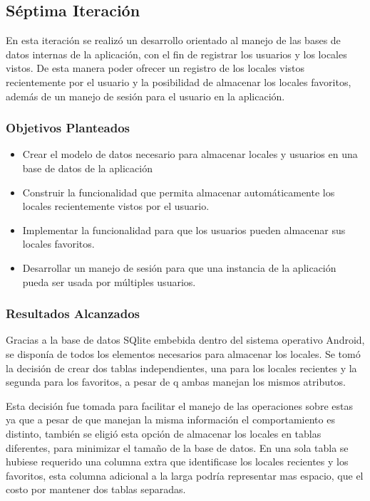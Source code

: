 \subsection{Séptima Iteración}

En esta iteración se realizó un desarrollo orientado al manejo de las bases de datos internas de la aplicación, con el fin de registrar los usuarios y los locales vistos. De esta manera poder ofrecer un registro de los locales vistos recientemente por el usuario y la posibilidad de almacenar los locales favoritos, además de un manejo de sesión para el usuario en la aplicación.

\subsubsection{Objetivos Planteados} 

\begin{itemize}
\item Crear el modelo de datos necesario para almacenar locales y usuarios en una base de datos de la aplicación
\item Construir la funcionalidad que permita almacenar automáticamente los locales recientemente vistos por el usuario.
\item Implementar la funcionalidad para que los usuarios pueden almacenar sus locales favoritos.
\item Desarrollar un manejo de sesión para que una instancia de la aplicación pueda ser usada por múltiples usuarios. 
\end{itemize}

\subsubsection{Resultados Alcanzados}

Gracias a la base de datos SQlite embebida dentro del sistema operativo Android, se disponía de todos los elementos necesarios para almacenar los locales. Se tomó la decisión de crear dos tablas independientes, una para los locales recientes y la segunda para los favoritos, a pesar de q ambas manejan los mismos atributos.

Esta decisión fue tomada para facilitar el manejo de las operaciones sobre estas ya que a pesar de que manejan la misma información el comportamiento es distinto, también se eligió esta opción de almacenar los locales en tablas diferentes, para minimizar el tamaño de la base de datos. En una sola tabla se hubiese requerido una columna extra que identificase los locales recientes y los favoritos, esta columna adicional a la larga podría representar mas espacio, que el costo por mantener dos tablas separadas.


